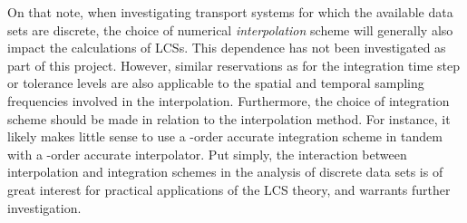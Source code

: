 On that note, when investigating transport systems for which the available
data sets are discrete, the choice of numerical \emph{interpolation} scheme
will generally also impact the calculations of LCSs. This dependence has not
been investigated as part of this project. However, similar reservations
as for the integration time step or tolerance levels are also applicable to
the spatial and temporal sampling frequencies involved in the interpolation.
Furthermore, the choice of integration scheme should be made in relation
to the interpolation method. For instance, it likely makes little sense to use a
-order accurate integration scheme in tandem with a -order
accurate interpolator. Put simply, the interaction between interpolation
and integration schemes in the analysis of discrete data sets is of great
interest for practical applications of the LCS theory, and warrants
further investigation.
